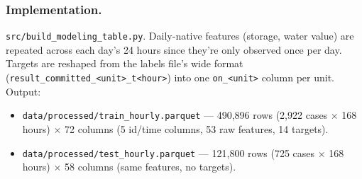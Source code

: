 \subsubsection*{Implementation.} \texttt{src/build\_modeling\_table.py}. Daily-native features
(storage, water value) are repeated across each day's 24 hours since they're only observed once
per day. Targets are reshaped from the labels file's wide format
(\texttt{result\_committed\_<unit>\_t<hour>}) into one \texttt{on\_<unit>} column per unit.
Output:

\begin{itemize}
  \item \texttt{data/processed/train\_hourly.parquet} --- 490{,}896 rows (2{,}922 cases
    $\times$ 168 hours) $\times$ 72 columns (5 id/time columns, 53 raw features, 14 targets).
  \item \texttt{data/processed/test\_hourly.parquet} --- 121{,}800 rows (725 cases $\times$
    168 hours) $\times$ 58 columns (same features, no targets).
\end{itemize}


